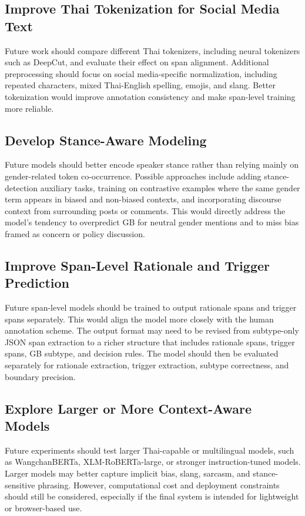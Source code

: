 \documentclass[12pt,oneside,openright,a4paper]{cpe-english-project}
\begin{document}
\subsection{Improve Thai Tokenization for Social Media Text}

Future work should compare different Thai tokenizers, including neural tokenizers such as DeepCut, and evaluate their effect on span alignment. Additional preprocessing should focus on social media-specific normalization, including repeated characters, mixed Thai-English spelling, emojis, and slang. Better tokenization would improve annotation consistency and make span-level training more reliable.

\subsection{Develop Stance-Aware Modeling}

Future models should better encode speaker stance rather than relying mainly on gender-related token co-occurrence. Possible approaches include adding stance-detection auxiliary tasks, training on contrastive examples where the same gender term appears in biased and non-biased contexts, and incorporating discourse context from surrounding posts or comments. This would directly address the model's tendency to overpredict GB for neutral gender mentions and to miss bias framed as concern or policy discussion.

\subsection{Improve Span-Level Rationale and Trigger Prediction}

Future span-level models should be trained to output rationale spans and trigger spans separately. This would align the model more closely with the human annotation scheme. The output format may need to be revised from subtype-only JSON span extraction to a richer structure that includes rationale spans, trigger spans, GB subtype, and decision rules. The model should then be evaluated separately for rationale extraction, trigger extraction, subtype correctness, and boundary precision.

\subsection{Explore Larger or More Context-Aware Models}

Future experiments should test larger Thai-capable or multilingual models, such as WangchanBERTa, XLM-RoBERTa-large, or stronger instruction-tuned models. Larger models may better capture implicit bias, slang, sarcasm, and stance-sensitive phrasing. However, computational cost and deployment constraints should still be considered, especially if the final system is intended for lightweight or browser-based use.
\end{document}
